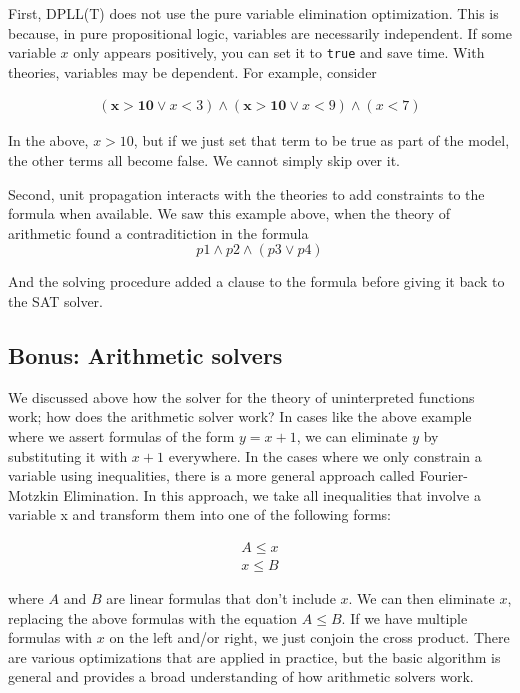 \documentclass[11pt]{article}
\begin{document}
First, DPLL(T) does not use the pure variable elimination optimization.  This is
because, in pure propositional logic, variables are necessarily independent.  If
some variable $x$ only appears positively, you can set it to \texttt{true} and
save time.  With theories, variables may be dependent.  For example, consider

\[
\begin{array}{c}
(\mathbf{x > 10} \lor x < 3) \land (\mathbf{x > 10} \lor x < 9) \land (x < 7)
\end{array}
\]

In the above, $x > 10$, but if we just set that term to be true as part of the
model, the other terms all become false.  We cannot simply skip over it. 

Second, unit propagation interacts with the theories to add constraints to the
formula when available.  We saw this example above, when the theory of
arithmetic found a contraditiction in the formula 
\[
p1 \land p2 \land (p3 \lor p4)
\]

And the solving procedure added a clause to the formula before giving it back to
the SAT solver. 

\subsection{Bonus: Arithmetic solvers}

We discussed above how the solver for the theory of uninterpreted functions
work; how does the arithmetic solver work? In cases like the above example where
we assert formulas of the form $y = x + 1$, we can eliminate $y$ by substituting
it with $x+1$ everywhere. In the cases where we only constrain a variable using
inequalities, there is a more general approach called Fourier-Motzkin
Elimination. In this approach, we take all inequalities that involve a variable
x and transform them into one of the following forms:

\[
\begin{array}{c}
A \leq x \\
x \leq B
\end{array}
\]

where $A$ and $B$ are linear formulas that don't include $x$. We can then
eliminate $x$, replacing the above formulas with the equation $A \leq B$. If we
have multiple formulas with $x$ on the left and/or right, we just conjoin the
cross product. There are various optimizations that are applied in practice, but
the basic algorithm is general and provides a broad understanding of how
arithmetic solvers work.
\end{document}
